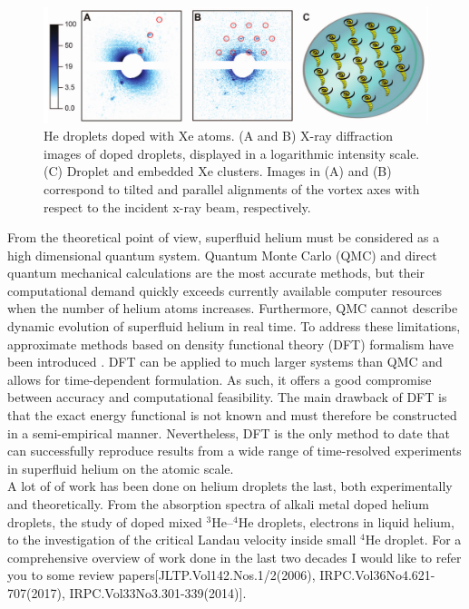 \documentclass[11pt,a4paper,twoside]{article}
\begin{document}
		\begin{figure}[t]
			\begin{center}
				\includegraphics[width=\textwidth]{vortex-array}
			\end{center}
			\caption{He droplets doped with Xe atoms. (A and B) X-ray diffraction images of doped droplets, displayed in a logarithmic intensity scale. (C) Droplet and embedded Xe clusters. Images in (A) and (B) correspond to tilted and parallel alignments of the vortex axes with respect to the incident x-ray beam, respectively.}
			\label{fig:vortex-array}
		\end{figure}
		
		From the theoretical point of view, superfluid helium must be considered as a high dimensional quantum system. Quantum Monte Carlo (QMC) \cite{Kro02} and direct quantum mechanical \cite{deL06,deL10,Agu13} calculations are the most accurate methods, but their computational demand quickly exceeds currently available computer resources when the number of helium atoms increases. Furthermore, QMC cannot describe dynamic evolution of superfluid helium in real time. To address these limitations, approximate methods based on  density functional theory (DFT) formalism have been introduced \cite{Str87a,Str87b,Dal95}. DFT can be applied to much larger systems than QMC and allows for time-dependent formulation. As such, it offers a good compromise between accuracy and computational feasibility. The main drawback of DFT is that the exact energy functional is not known and must therefore be constructed in a semi-empirical manner. Nevertheless, DFT is the only method to date that can successfully reproduce results from a wide range of time-resolved experiments in superfluid helium on the atomic scale.\\
		
	A lot of of work has been done on helium droplets the last, both experimentally and theoretically. From the absorption spectra of alkali metal doped helium droplets, the study of doped mixed $^3$He--$^4$He droplets, electrons in liquid helium, to the investigation of the critical Landau velocity inside small $^4$He droplet. For a comprehensive overview of work done in the last two decades I would like to refer you to some review papers[JLTP.Vol142.Nos.1/2(2006), IRPC.Vol36No4.621-707(2017), IRPC.Vol33No3.301-339(2014)].
	
\end{document}
